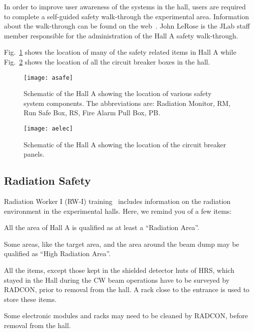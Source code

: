 {{In order to improve user awareness of the systems in the hall,
users are required to complete a self-guided safety walk-through
the experimental area. Information about the walk-through can be
found on the web~\cite{SAThalla}.
John LeRose is the JLab staff member responsible for the
administration of the Hall A safety walk-through.

Fig.~\ref{fig:asafe} shows the location of
many of the safety related items in Hall A while
Fig.~\ref{fig:aelec} shows the location of all the circuit
breaker boxes in the hall.

\begin{figure}
\begin{center}
\texttt{[image: asafe]}
{\linespread{1.}
\caption[Introduction: Location of Hall Safety Items ]{Schematic
of the Hall A showing the location of various safety system
components. The abbreviations are: Radiation Monitor, RM, Run
Safe Box, RS, Fire Alarm Pull Box, PB. }
\label{fig:asafe}}
\end{center}
\end{figure}

\begin{figure}
\begin{center}
\texttt{[image: aelec]}
{\linespread{1.}
\caption[Introduction: Location of Circuit Breakers]{Schematic of
the Hall A showing the location of the circuit breaker panels.}
\label{fig:aelec}}
\end{center}
\end{figure}

\begin{safetyen}{0}{0}
\subsection{Radiation Safety}
\end{safetyen}

Radiation Worker I (RW-I) training~\cite{RWIcebaf} includes information on the
radiation environment in the experimental halls. Here, we remind you of a few items:
 \begin{list}{--}{\setlength{\itemsep}{-0.2cm}}
    \item All the area of Hall A is qualified as at least a ``Radiation Area''.
    \item Some areas, like the target area, and the area around the beam dump may be qualified as ``High Radiation Area''.
    \item All the items, except those kept in the shielded detector huts of HRS, 
          which stayed in the Hall during the CW beam operations
          have to be surveyed by RADCON, prior to removal from the hall. 
          A rack close to the entrance is used to store these items.
    \item Some electronic modules and racks may need to be cleaned by RADCON, before
          removal from the hall.        
 \end{list}
}
}
 
